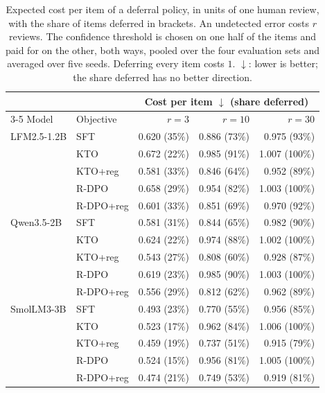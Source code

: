 \begin{table}[t]
\centering
\caption{Expected cost per item of a deferral policy, in units of one human review, with the share of items deferred in brackets. An undetected error costs $r$ reviews. The confidence threshold is chosen on one half of the items and paid for on the other, both ways, pooled over the four evaluation sets and averaged over five seeds. Deferring every item costs $1$. $\downarrow$: lower is better; the share deferred has no better direction.}
\label{tab:deferral}
\footnotesize
\begin{tabular}{llrrr}
\toprule
& & \multicolumn{3}{c}{Cost per item $\downarrow$ (share deferred)} \\ \cmidrule(lr){3-5}
Model & Objective & $r = 3$ & $r = 10$ & $r = 30$ \\
\midrule
LFM2.5-1.2B & SFT & 0.620 (35\%) & 0.886 (73\%) & 0.975 (93\%) \\
 & KTO & 0.672 (22\%) & 0.985 (91\%) & 1.007 (100\%) \\
 & KTO+reg & 0.581 (33\%) & 0.846 (64\%) & 0.952 (89\%) \\
 & R-DPO & 0.658 (29\%) & 0.954 (82\%) & 1.003 (100\%) \\
 & R-DPO+reg & 0.601 (33\%) & 0.851 (69\%) & 0.970 (92\%) \\
\addlinespace
Qwen3.5-2B & SFT & 0.581 (31\%) & 0.844 (65\%) & 0.982 (90\%) \\
 & KTO & 0.624 (22\%) & 0.974 (88\%) & 1.002 (100\%) \\
 & KTO+reg & 0.543 (27\%) & 0.808 (60\%) & 0.928 (87\%) \\
 & R-DPO & 0.619 (23\%) & 0.985 (90\%) & 1.003 (100\%) \\
 & R-DPO+reg & 0.556 (29\%) & 0.812 (62\%) & 0.962 (89\%) \\
\addlinespace
SmolLM3-3B & SFT & 0.493 (23\%) & 0.770 (55\%) & 0.956 (85\%) \\
 & KTO & 0.523 (17\%) & 0.962 (84\%) & 1.006 (100\%) \\
 & KTO+reg & 0.459 (19\%) & 0.737 (51\%) & 0.915 (79\%) \\
 & R-DPO & 0.524 (15\%) & 0.956 (81\%) & 1.005 (100\%) \\
 & R-DPO+reg & 0.474 (21\%) & 0.749 (53\%) & 0.919 (81\%) \\
\bottomrule
\end{tabular}
\end{table}
